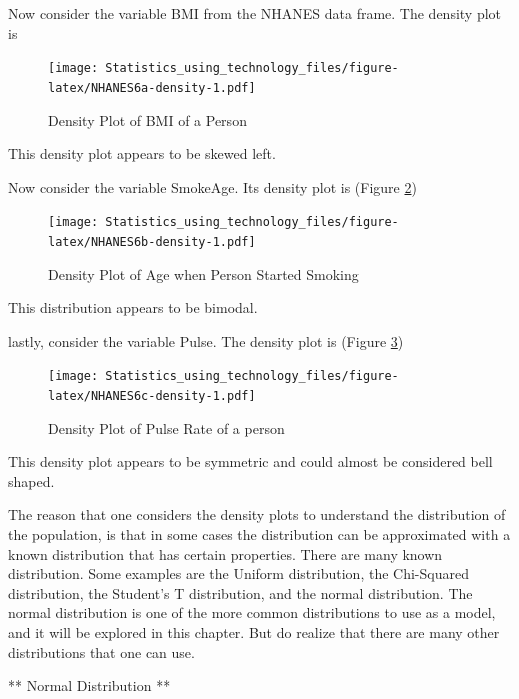 \documentclass[]{book}
\begin{document}
Now consider the variable BMI from the NHANES data frame. The density plot is



\begin{figure}
\centering
\texttt{[image: Statistics\_using\_technology\_files/figure-latex/NHANES6a-density-1.pdf]}
\caption{\label{fig:NHANES6a-density}Density Plot of BMI of a Person}
\end{figure}

This density plot appears to be skewed left.

Now consider the variable SmokeAge. Its density plot is (Figure \ref{fig:NHANES6b-density})



\begin{figure}
\centering
\texttt{[image: Statistics\_using\_technology\_files/figure-latex/NHANES6b-density-1.pdf]}
\caption{\label{fig:NHANES6b-density}Density Plot of Age when Person Started Smoking}
\end{figure}

This distribution appears to be bimodal.

lastly, consider the variable Pulse. The density plot is (Figure \ref{fig:NHANES6c-density})



\begin{figure}
\centering
\texttt{[image: Statistics\_using\_technology\_files/figure-latex/NHANES6c-density-1.pdf]}
\caption{\label{fig:NHANES6c-density}Density Plot of Pulse Rate of a person}
\end{figure}

This density plot appears to be symmetric and could almost be considered bell shaped.

The reason that one considers the density plots to understand the distribution of the population, is that in some cases the distribution can be approximated with a known distribution that has certain properties. There are many known distribution. Some examples are the Uniform distribution, the Chi-Squared distribution, the Student's T distribution, and the normal distribution. The normal distribution is one of the more common distributions to use as a model, and it will be explored in this chapter. But do realize that there are many other distributions that one can use.

** Normal Distribution **
\end{document}
